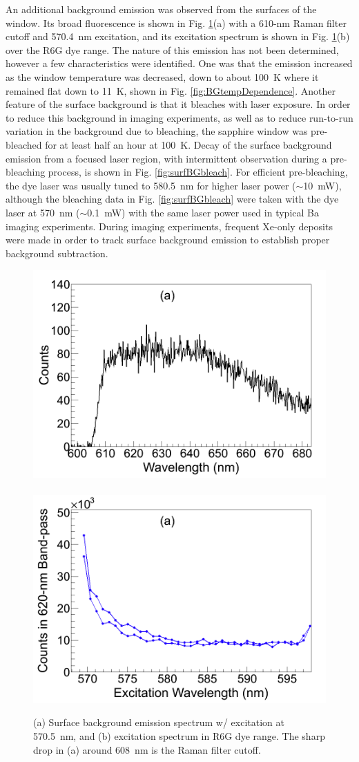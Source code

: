 An additional background emission was observed from the surfaces of the window.  Its broad fluorescence is shown in Fig. \ref{fig:surfBG}(a) with a 610-nm Raman filter cutoff and 570.4~nm excitation, and its excitation spectrum is shown in Fig. \ref{fig:surfBG}(b) over the R6G dye range.  The nature of this emission has not been determined, however a few characteristics were identified.  One was that the emission increased as the window temperature was decreased, down to about 100~K where it remained flat down to 11~K, shown in Fig. \ref{fig:BGtempDependence}.  Another feature of the surface background is that it bleaches with laser exposure.  In order to reduce this background in imaging experiments, as well as to reduce run-to-run variation in the background due to bleaching, the sapphire window was pre-bleached for at least half an hour at 100~K.  Decay of the surface background emission from a focused laser region, with intermittent observation during a pre-bleaching process, is shown in Fig. \ref{fig:surfBGbleach}.  For efficient pre-bleaching, the dye laser was usually tuned to 580.5~nm for higher laser power ($\sim$10~mW), although the bleaching data in Fig. \ref{fig:surfBGbleach} were taken with the dye laser at 570~nm ($\sim$0.1~mW) with the same laser power used in typical Ba imaging experiments.  During imaging experiments, frequent Xe-only deposits were made in order to track surface background emission to establish proper background subtraction.

\begin{figure} %
        \centering
                \includegraphics[width=.5\textwidth]{figures/surfaceBG_a.png}
                ~
                \includegraphics[width=.5\textwidth]{figures/surfaceBG_b.png}
                \caption{(a) Surface background emission spectrum w/ excitation at 570.5~nm, and (b) excitation spectrum in R6G dye range.  The sharp drop in (a) around 608~nm is the Raman filter cutoff.}
\label{fig:surfBG}
\end{figure}

